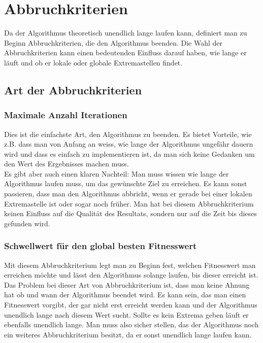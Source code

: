 \section{Abbruchkriterien}

Da der Algorithmus theoretisch unendlich lange laufen kann, definiert man zu Beginn Abbruchkriterien, die den Algorithmus beenden.
Die Wahl der Abbruchkriterien kann einen bedeutenden Einfluss darauf haben, wie lange er läuft und ob er lokale oder globale Extremastellen findet.

\subsection{Art der Abbruchkriterien}

\subsubsection{Maximale Anzahl Iterationen}
Dies ist die einfachste Art, den Algorithmus zu beenden. Es bietet Vorteile, wie z.B. dass man von Anfang an weiss, wie lange der Algorithmus ungefähr dauern wird und dass es einfach zu implementieren ist, da man sich keine Gedanken um den Wert des Ergebnisses machen muss. \\

Es gibt aber auch einen klaren Nachteil: Man muss wissen wie lange der Algorithmus laufen muss, um das gewünschte Ziel zu erreichen. Es kann sonst passieren, dass man den Algorithmus abbricht, wenn er gerade bei einer lokalen Extremastelle ist oder sogar noch früher. Man hat bei diesem Abbruchkriterium keinen Einfluss auf die Qualität des Resultats, sondern nur auf die Zeit bis dieses gefunden wird.

\subsubsection{Schwellwert für den global besten Fitnesswert}
Mit diesem Abbruchkriterium legt man zu Beginn fest, welchen Fitnesswert man erreichen möchte und lässt den Algorithmus solange laufen, bis dieser erreicht ist.\\

Das Problem bei dieser Art von Abbruchkriterium ist, dass man keine Ahnung hat ob und wann der Algorithmus beendet wird. Es kann sein, das man einen Fitnesswert vorgibt, der gar nicht erst erreicht werden kann und der Algorithmus unendlich lange nach diesem Wert sucht. Sollte es kein Extrema geben läuft er ebenfalls unendlich lange. Man muss also sicher stellen, das der Algorithmus noch ein weiteres Abbruchkriterium besitzt, da er sonst unendlich lange laufen kann.

